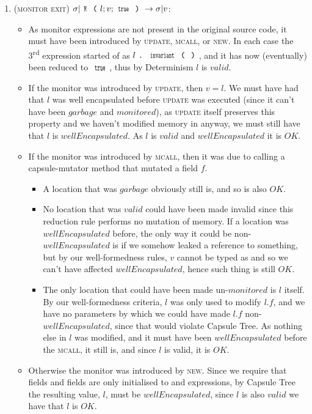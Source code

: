 \begin{enumerate}
\item (\textsc{monitor exit}) $\sigma|\Kw{M}\oR l; v;\Kw{true}\cR\rightarrow \sigma|v$:
\begin{itemize}
	\item As monitor expressions are not present in the original source code, it must have been introduced by \textsc{update}, \textsc{mcall}, or \textsc{new}. In each case the 3\textsuperscript{rd} expression started of as $l\singleDot\Kw{invariant}\oR\cR$, and it has now (eventually) been reduced to $\Kw{true}$, thus by Determinism $l$ is $valid$.

	\item  If the monitor was introduced by \textsc{update}, then $v = l$. We must have had that $l$ was well encapsulated before \textsc{update} was executed (since it can't have been $garbage$ and $monitored$), as \textsc{update} itself preserves this property and we haven't modified memory in anyway, we must still have that $l$ is $wellEncapsulated$. As $l$ is $valid$ and $wellEncapsulated$ it is $OK$.

	\item If the monitor was introduced by \textsc{mcall}, then it was due to calling a capsule-mutator method that mutated a field $f$.
	\begin{itemize}
		\item A location that was $garbage$ obviously still is, and so is also $OK$.
		\item No location that was $valid$ could have been made invalid since this reduction rule performs no mutation of memory. If a location was $wellEncapsulated$ before, the only way it could be non-$wellEncapsulated$ is if we somehow leaked a \Q@mut@ reference to something, but by our well-formedness rules, $v$ cannot be typed as \Q@mut@ and so we can't have affected $wellEncapsulated$, hence such thing is still $OK$.
		\item The only location that could have been made un-$monitored$ is $l$ itself. By our well-formedness criteria, $l$ was only used to modify $l.f$, and we have no parameters by which we could have made $l.f$ non-$wellEncapsulated$, since that would violate Capsule Tree. As nothing else in $l$ was modified, and it must have been $wellEncapsulated$ before the \textsc{mcall}, it still is, and since  $l$ is valid, it is $OK$.
	\end{itemize}
	\item Otherwise the monitor was introduced by \textsc{new}. Since we require that \Q@capsule@ fields and \Q@imm@ fields are only initialised to \Q@capsule@ and \Q@imm@ expressions, by Capsule Tree the resulting value, $l$, must be $wellEncapsulated$, since $l$ is also $valid$ we have that $l$ is $OK$.


\end{itemize}
\end{enumerate}
